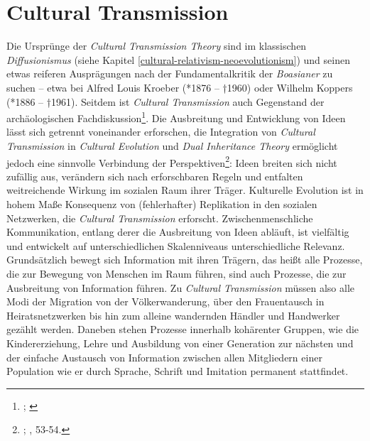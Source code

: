 \documentclass[openany,twoside,twocolumn]{book}
\let\rmarkdownfootnote\footnote%
\def\footnote{\protect\rmarkdownfootnote}
\begin{document}
\hypertarget{cultural-transmission}{%
\section{Cultural Transmission}\label{cultural-transmission}}

Die Ursprünge der \emph{Cultural Transmission Theory} sind im
klassischen \emph{Diffusionismus} (siehe Kapitel
\ref{cultural-relativism-neoevolutionism}) und seinen etwas reiferen
Ausprägungen nach der Fundamentalkritik der \emph{Boasianer} zu suchen
-- etwa bei Alfred Louis Kroeber (*1876 -- †1960) oder Wilhelm Koppers
(*1886 -- †1961). Seitdem ist \emph{Cultural Transmission} auch
Gegenstand der archäologischen Fachdiskussion\footnote{\textcite{lyman_cultural_2008};
  \textcite{shennan_evolution_2008}}. Die Ausbreitung und Entwicklung
von Ideen lässt sich getrennt voneinander erforschen, die Integration
von \emph{Cultural Transmission} in \emph{Cultural Evolution} und
\emph{Dual Inheritance Theory} ermöglicht jedoch eine sinnvolle
Verbindung der Perspektiven\footnote{\textcite{eerkens_cultural_2007};
  \textcite{cavalli-sforza_cultural_1981}, 53-54.}: Ideen breiten sich
nicht zufällig aus, verändern sich nach erforschbaren Regeln und
entfalten weitreichende Wirkung im sozialen Raum ihrer Träger.
Kulturelle Evolution ist in hohem Maße Konsequenz von (fehlerhafter)
Replikation in den sozialen Netzwerken, die \emph{Cultural Transmission}
erforscht. Zwischenmenschliche Kommunikation, entlang derer die
Ausbreitung von Ideen abläuft, ist vielfältig und entwickelt auf
unterschiedlichen Skalenniveaus unterschiedliche Relevanz. Grundsätzlich
bewegt sich Information mit ihren Trägern, das heißt alle Prozesse, die
zur Bewegung von Menschen im Raum führen, sind auch Prozesse, die zur
Ausbreitung von Information führen. Zu \emph{Cultural Transmission}
müssen also alle Modi der Migration von der Völkerwanderung, über den
Frauentausch in Heiratsnetzwerken bis hin zum alleine wandernden Händler
und Handwerker gezählt werden. Daneben stehen Prozesse innerhalb
kohärenter Gruppen, wie die Kindererziehung, Lehre und Ausbildung von
einer Generation zur nächsten und der einfache Austausch von Information
zwischen allen Mitgliedern einer Population wie er durch Sprache,
Schrift und Imitation permanent stattfindet.
\end{document}
